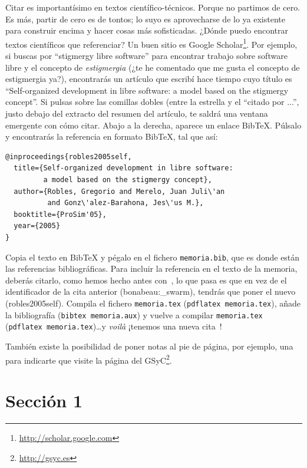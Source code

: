 \documentclass[a4paper, 12pt]{book}
\begin{document}
Citar es importantísimo en textos científico-técnicos. 
Porque no partimos de cero.
Es más, partir de cero es de tontos; lo suyo es aprovecharse de lo ya existente para construir encima y hacer cosas más sofisticadas.
¿Dónde puedo encontrar textos científicos que referenciar?
Un buen sitio es Google Scholar\footnote{\url{http://scholar.google.com}}.
Por ejemplo, si buscas por ``stigmergy libre software'' para encontrar trabajo sobre software libre y el concepto de \emph{estigmergia} (¿te he comentado que me gusta el concepto de estigmergia ya?), encontrarás un artículo que escribí hace tiempo cuyo título es ``Self-organized development in libre software: a model based on the stigmergy concept''.
Si pulsas sobre las comillas dobles (entre la estrella y el ``citado por ...'', justo debajo del extracto del resumen del artículo, te saldrá una ventana emergente con cómo citar.
Abajo a la derecha, aparece un enlace BibTeX.
Púlsalo y encontrarás la referencia en formato BibTeX, tal que así:

{\footnotesize
\begin{verbatim}
@inproceedings{robles2005self,
  title={Self-organized development in libre software:
         a model based on the stigmergy concept},
  author={Robles, Gregorio and Merelo, Juan Juli\'an 
          and Gonz\'alez-Barahona, Jes\'us M.},
  booktitle={ProSim'05},
  year={2005}
}
\end{verbatim}
}

Copia el texto en BibTeX y pégalo en el fichero \texttt{memoria.bib}, que es donde están las referencias bibliográficas.
Para incluir la referencia en el texto de la memoria, deberás citarlo, como hemos hecho antes con~\cite{bonabeau:_swarm}, lo que pasa es que en vez de el identificador de la cita anterior (bonabeau:\_swarm), tendrás que poner el nuevo (robles2005self).
Compila el fichero \texttt{memoria.tex} (\texttt{pdflatex memoria.tex}), añade la bibliografía (\texttt{bibtex memoria.aux}) y vuelve a compilar \texttt{memoria.tex} (\texttt{pdflatex memoria.tex})\ldots y \emph{voilà} ¡tenemos una nueva cita~\cite{robles2005self}!

También existe la posibilidad de poner notas al pie de página, por ejemplo, una para indicarte que visite la página del GSyC\footnote{\url{http://gsyc.es}}.



\section{Sección 1} 
\label{sec:seccion1}
\end{document}
